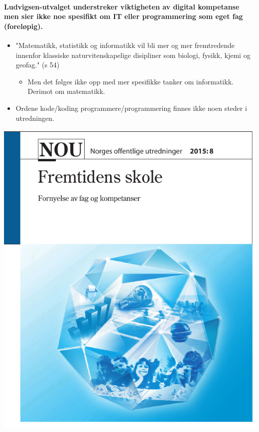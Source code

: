 \documentclass[%
oneside,                 %
final,                   %
10pt]{article}
\begin{document}
\noindent

\paragraph{Ludvigsen-utvalget understreker viktigheten av digital kompetanse men sier ikke noe spesifikt om IT eller programmering som eget fag (foreløpig).}
\begin{itemize}
\item "Matematikk, statistikk og informatikk vil bli mer og mer fremtredende innenfor klassiske naturvitenskapelige disipliner som biologi, fysikk, kjemi og geofag." (s 54)
\begin{itemize}

 \item Men det følges ikke opp med mer spesifikke tanker om informatikk. Derimot om matematikk.

\end{itemize}

\noindent
\item Ordene kode/koding programmere/programmering finnes ikke noen steder i utredningen.
\end{itemize}

\noindent


\centerline{\includegraphics[width=0.9\linewidth]{fig/ludvigsen.png}}
\end{document}
